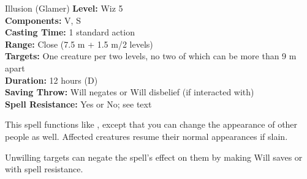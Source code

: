 {Illusion (Glamer)}
{
	\textbf{Level:}
	Wiz 5\\
	\textbf{Components:}
	V, S\\
	\textbf{Casting Time:}
	1 standard action\\
	\textbf{Range:}
	Close (7.5 m + 1.5 m/2 levels)\\
	\textbf{Targets:}
	One creature per two levels, no two of which can be more than 9 m apart\\
	\textbf{Duration:}
	12 hours (D)\\
	\textbf{Saving Throw:}
	Will negates or Will disbelief (if interacted with)\\
	\textbf{Spell Resistance:}
	Yes or No; see text\\
}
{
	This spell functions like , except that you can change the appearance of other people as well. Affected creatures resume their normal appearances if slain.

	Unwilling targets can negate the spell's effect on them by making Will saves or with spell resistance.

}
